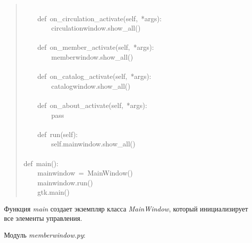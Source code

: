 \documentclass[a4paper,openany,twoside,final]{book}
\providecommand*{\DUroletitlereference}[1]{\textsl{#1}}
\begin{document}
\begin{quote}
{~\\
~~~~def~on\_circulation\_activate(self,~*args):\\
~~~~~~~~circulationwindow.show\_all()\\
~\\
~~~~def~on\_member\_activate(self,~*args):\\
~~~~~~~~memberwindow.show\_all()\\
~\\
~~~~def~on\_catalog\_activate(self,~*args):\\
~~~~~~~~catalogwindow.show\_all()\\
~\\
~~~~def~on\_about\_activate(self,~*args):\\
~~~~~~~~pass\\
~\\
~~~~def~run(self):\\
~~~~~~~~self.mainwindow.show\_all()\\
~\\
def~main():\\
~~~~mainwindow~=~MainWindow()\\
~~~~mainwindow.run()\\
~~~~gtk.main()
}
\end{quote}

Функция \DUroletitlereference{main} создает экземпляр класса \DUroletitlereference{MainWindow}, который
инициализирует все элементы управления.

Модуль \DUroletitlereference{memberwindow.py}:
\end{document}
